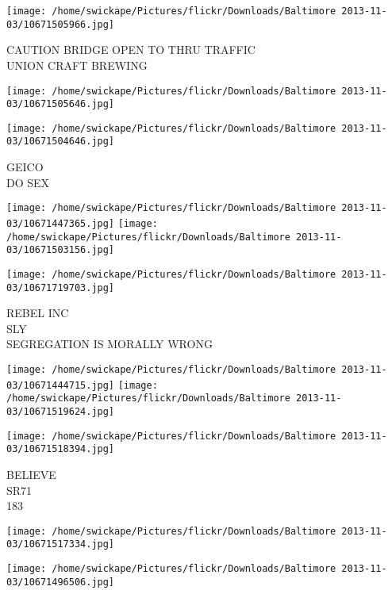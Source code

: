 \documentclass[10pt,letterpaper]{article}
\begin{document}
\vspace{0.25in}
\texttt{[image: /home/swickape/Pictures/flickr/Downloads/Baltimore 2013-11-03/10671505966.jpg]}

CAUTION BRIDGE OPEN TO THRU TRAFFIC\\
UNION CRAFT BREWING\\
\pagebreak

\texttt{[image: /home/swickape/Pictures/flickr/Downloads/Baltimore 2013-11-03/10671505646.jpg]}

\vspace{0.25in}
\texttt{[image: /home/swickape/Pictures/flickr/Downloads/Baltimore 2013-11-03/10671504646.jpg]}

GEICO\\
DO SEX\\
\pagebreak

\texttt{[image: /home/swickape/Pictures/flickr/Downloads/Baltimore 2013-11-03/10671447365.jpg]}
\texttt{[image: /home/swickape/Pictures/flickr/Downloads/Baltimore 2013-11-03/10671503156.jpg]}

\vspace{0.25in}
\texttt{[image: /home/swickape/Pictures/flickr/Downloads/Baltimore 2013-11-03/10671719703.jpg]}

REBEL INC\\
SLY\\
SEGREGATION IS MORALLY WRONG\\
\pagebreak

\texttt{[image: /home/swickape/Pictures/flickr/Downloads/Baltimore 2013-11-03/10671444715.jpg]}
\texttt{[image: /home/swickape/Pictures/flickr/Downloads/Baltimore 2013-11-03/10671519624.jpg]}

\texttt{[image: /home/swickape/Pictures/flickr/Downloads/Baltimore 2013-11-03/10671518394.jpg]}

BELIEVE\\
SR71\\
183\\
\pagebreak

\texttt{[image: /home/swickape/Pictures/flickr/Downloads/Baltimore 2013-11-03/10671517334.jpg]}

\vspace{0.25in}
\texttt{[image: /home/swickape/Pictures/flickr/Downloads/Baltimore 2013-11-03/10671496506.jpg]}
\end{document}
